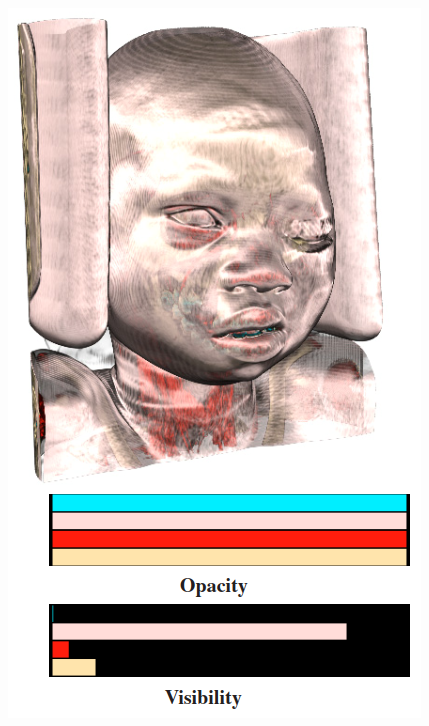 \begin{figure}
\centering
\begin{minipage}{.49\textwidth}
\includegraphics[width=1\linewidth]{images/wang_efficient_2011_a}
\end{minipage}~
\begin{minipage}{.49\textwidth}

\end{minipage}
\end{figure}
